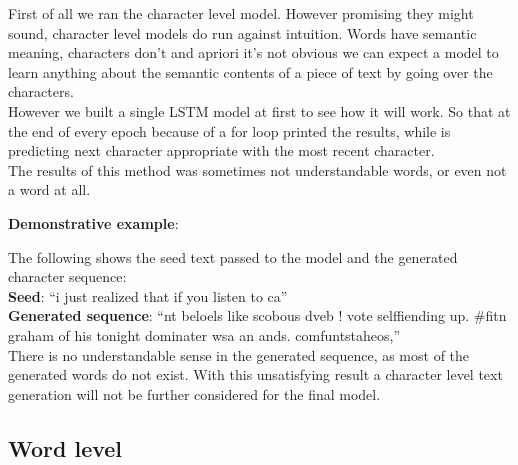 \documentclass[hidelinks, conference]{IEEEtran}
\begin{document}
First of all we ran the character level model. However promising they might sound, character level models do run against intuition. Words have semantic meaning, characters don't and apriori it's not obvious we can expect a model to learn anything about the semantic contents of a piece of text by going over the characters.\\
However we built a single LSTM model at first to see how it will work. So that at the end of every epoch because of a for loop printed the results, while is predicting next character appropriate with the most recent character.\\
The results of this method was sometimes not understandable words, or even not a word at all.

\textbf{Demonstrative example}:

The following shows the seed text passed to the model and the generated character sequence:\\

\textbf{Seed}: ``i just realized that if you listen to ca''\\

\textbf{Generated sequence}: ``nt beloels like scobous dveb ! vote selffiending up. \#fitn graham of his tonight dominater wsa an ands. comfuntstaheos,''\\

There is no understandable sense in the generated sequence, as most of the generated words do not exist. With this unsatisfying result a character level text generation will not be further considered for the final model.

\subsection{Word level}
\end{document}
